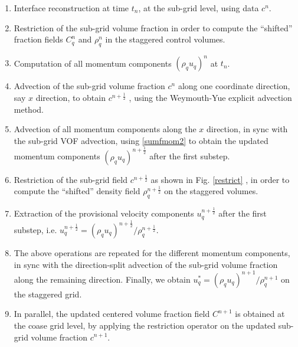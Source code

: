 \begin{enumerate}

\item Interface reconstruction at time $t_n$, at the sub-grid level,
	using data $c^{n}$.
        

\item Restriction of the sub-grid volume fraction in order     
	to compute the ``shifted'' fraction fields $C^{n}_q$ and $\rho^{n}_q$
	in the staggered control volumes.

\item Computation of all momentum components $(\rho_q u_q)^{n}$
	at $t_n$.

\item Advection of the sub-grid volume fraction $c^n$ along one coordinate direction, 
	say $x$ direction, to obtain $c^{n + \frac{1}{2}}$ , using the Weymouth-Yue explicit advection method.  
	
\item Advection of all momentum components along the $x$ direction, 
	in sync with the sub-grid VOF advection, 
	using \eqref{sumfmom2} to obtain the updated momentum components
		$(\rho_q u_q)^{n + \frac{1}{2}}$ after the first substep.

\item Restriction of the sub-grid field $c^{n + \frac{1}{2}}$ as shown in Fig. \ref{restrict}
	, in order to compute the ``shifted'' density field $\rho^{n + \frac{1}{2}}_q$ on the staggered volumes. 

\item Extraction of the provisional velocity components 
		$u_q^{n + \frac{1}{2}}$ after the first substep, 
		i.e. $u_q^{n + \frac{1}{2}} = (\rho_q u_q)^{n + \frac{1}{2}}/\rho_q^{n + \frac{1}{2}}$.

\item The above operations are repeated for the different momentum components,
	in sync with the direction-split advection of the sub-grid volume fraction
	along the remaining direction. 
Finally, we obtain $u_q^{*} = (\rho_q u_q)^{n + 1}/\rho_q^{n + 1}$ on the staggered grid.

\item In parallel, the updated centered volume fraction field $C^{n+1}$ is obtained  
	at the coase grid level, by applying the restriction operator 
	on the updated sub-grid volume fraction $c^{n+1}$. 

\end{enumerate}

